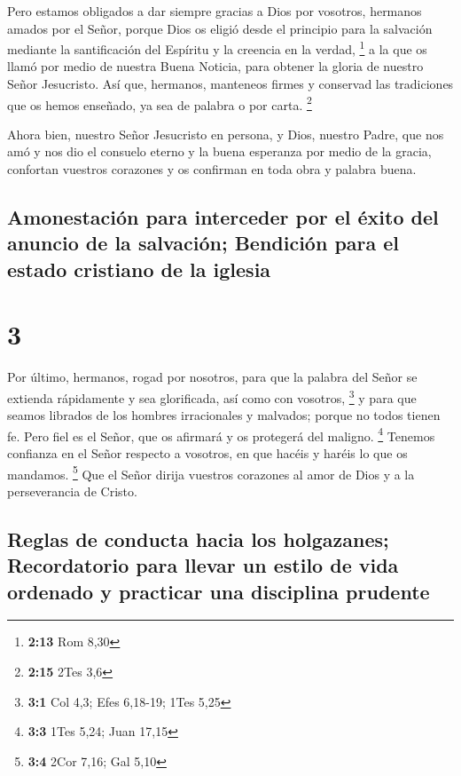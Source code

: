  Pero estamos obligados a dar siempre gracias a Dios por
vosotros, hermanos amados por el Señor, porque Dios os eligió desde el
principio para la salvación mediante la santificación del Espíritu y la
creencia en la verdad, \footnote{\textbf{2:13} Rom 8,30} 
a la que os llamó por medio de nuestra Buena Noticia, para obtener la
gloria de nuestro Señor Jesucristo.  Así que, hermanos,
manteneos firmes y conservad las tradiciones que os hemos enseñado, ya
sea de palabra o por carta. \footnote{\textbf{2:15} 2Tes 3,6}

 Ahora bien, nuestro Señor Jesucristo en persona, y Dios,
nuestro Padre, que nos amó y nos dio el consuelo eterno y la buena
esperanza por medio de la gracia,  confortan vuestros
corazones y os confirman en toda obra y palabra buena.

\hypertarget{amonestaciuxf3n-para-interceder-por-el-uxe9xito-del-anuncio-de-la-salvaciuxf3n-bendiciuxf3n-para-el-estado-cristiano-de-la-iglesia}{%
\subsection{Amonestación para interceder por el éxito del anuncio de la
salvación; Bendición para el estado cristiano de la
iglesia}\label{amonestaciuxf3n-para-interceder-por-el-uxe9xito-del-anuncio-de-la-salvaciuxf3n-bendiciuxf3n-para-el-estado-cristiano-de-la-iglesia}}

\hypertarget{section-2}{%
\section{3}\label{section-2}}

 Por último, hermanos, rogad por nosotros, para que la
palabra del Señor se extienda rápidamente y sea glorificada, así como
con vosotros, \footnote{\textbf{3:1} Col 4,3; Efes 6,18-19; 1Tes 5,25}
 y para que seamos librados de los hombres irracionales y
malvados; porque no todos tienen fe.  Pero fiel es el
Señor, que os afirmará y os protegerá del maligno. \footnote{\textbf{3:3}
  1Tes 5,24; Juan 17,15}  Tenemos confianza en el Señor
respecto a vosotros, en que hacéis y haréis lo que os mandamos.
\footnote{\textbf{3:4} 2Cor 7,16; Gal 5,10}  Que el Señor
dirija vuestros corazones al amor de Dios y a la perseverancia de
Cristo.

\hypertarget{reglas-de-conducta-hacia-los-holgazanes-recordatorio-para-llevar-un-estilo-de-vida-ordenado-y-practicar-una-disciplina-prudente}{%
\subsection{Reglas de conducta hacia los holgazanes; Recordatorio para
llevar un estilo de vida ordenado y practicar una disciplina
prudente}\label{reglas-de-conducta-hacia-los-holgazanes-recordatorio-para-llevar-un-estilo-de-vida-ordenado-y-practicar-una-disciplina-prudente}}


